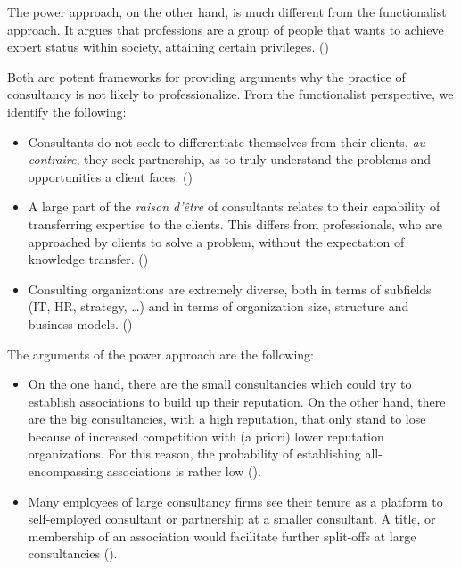 \documentclass[
  man,floatsintext]{apa6}
\begin{document}
The power approach, on the other hand, is much different from the functionalist approach. It argues that professions are a group of people that wants to achieve expert status within society, attaining certain privileges. ()

Both are potent frameworks for providing arguments why the practice of consultancy is not likely to professionalize. From the functionalist perspective, we identify the following:

\begin{itemize}
\item
  Consultants do not seek to differentiate themselves from their clients, \emph{au contraire}, they seek partnership, as to truly understand the problems and opportunities a client faces. ()
\item
  A large part of the \emph{raison d'être} of consultants relates to their capability of transferring expertise to the clients. This differs from professionals, who are approached by clients to solve a problem, without the expectation of knowledge transfer. ()
\item
  Consulting organizations are extremely diverse, both in terms of subfields (IT, HR, strategy, \ldots) and in terms of organization size, structure and business models. ()
\end{itemize}

The arguments of the power approach are the following:

\begin{itemize}
\item
  On the one hand, there are the small consultancies which could try to establish associations to build up their reputation. On the other hand, there are the big consultancies, with a high reputation, that only stand to lose because of increased competition with (a priori) lower reputation organizations. For this reason, the probability of establishing all-encompassing associations is rather low ().
\item
  Many employees of large consultancy firms see their tenure as a platform to self-employed consultant or partnership at a smaller consultant. A title, or membership of an association would facilitate further split-offs at large consultancies ().
\end{itemize}
\end{document}
